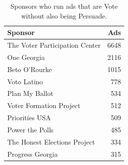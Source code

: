 \begin{table}[ht]
\centering
\begin{tabular}{lr}
  \hline
Sponsor & Ads \\ 
  \hline
The Voter Participation Center & 6648 \\ 
  One Georgia & 2116 \\ 
  Beto O'Rourke & 1015 \\ 
  Voto Latino & 778 \\ 
  Plan My Ballot & 534 \\ 
  Voter Formation Project & 512 \\ 
  Priorities USA & 509 \\ 
  Power the Polls & 485 \\ 
  The Honest Elections Project & 334 \\ 
  Progress Georgia & 315 \\ 
   \hline
\end{tabular}
\caption{Sponsors who run ads that are Vote without also being Persuade.} 
\label{tab:non_persuade_vote_sponsors}
\end{table}
